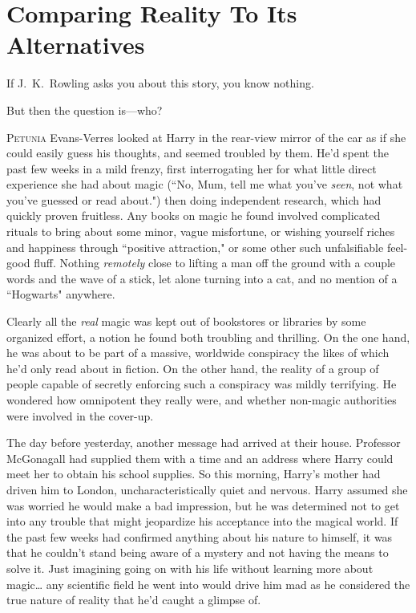 \chapter{Comparing Reality To Its Alternatives}

\begin{chapterOpeningAuthorNote}
If J.~K.~Rowling asks you about this story, you know nothing.
\end{chapterOpeningAuthorNote}
\begin{chapterOpeningQuote}
But then the question is—who?
\end{chapterOpeningQuote}

\lettrine{P}{etunia} Evans-Verres looked at Harry in the rear-view
mirror of the car as if she could easily guess his thoughts,
and seemed troubled by them. He'd spent the past few
weeks in a mild frenzy, first interrogating her for what little
direct experience she had about magic (``No, Mum, tell me
what you've \emph{seen}, not what you've guessed or read
about.") then doing independent research, which had
quickly proven fruitless. Any books on magic he found
involved complicated rituals to bring about some minor,
vague misfortune, or wishing yourself riches and happiness
through ``positive attraction," or some other such
unfalsifiable feel-good fluff. Nothing \emph{remotely} close to lifting
a man off the ground with a couple words and the wave
of a stick, let alone turning into a cat, and no mention of
a ``Hogwarts" anywhere.

Clearly all the \emph{real} magic was kept out of bookstores or
libraries by some organized effort, a notion he found both
troubling and thrilling. On the one hand, he was about to
be part of a massive, worldwide conspiracy the likes of
which he'd only read about in fiction. On the other hand,
the reality of a group of people capable of secretly
enforcing such a conspiracy was mildly terrifying. He
wondered how omnipotent they really were, and whether
non-magic authorities were involved in the cover-up.

The day before yesterday, another message had
arrived at their house. Professor McGonagall had supplied
them with a time and an address where Harry could meet
her to obtain his school supplies. So this morning, Harry's
mother had driven him to London, uncharacteristically quiet
and nervous. Harry assumed she was worried he would
make a bad impression, but he was determined not to get
into any trouble that might jeopardize his acceptance into
the magical world. If the past few weeks had confirmed
anything about his nature to himself, it was that he
couldn't stand being aware of a mystery and not having
the means to solve it. Just imagining going on with his life
without learning more about magic{\ldots} any scientific field he
went into would drive him mad as he considered the true
nature of reality that he'd caught a glimpse of.

